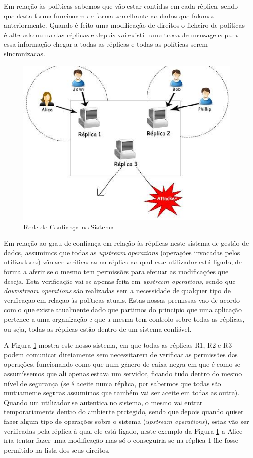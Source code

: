 \documentclass[runningheads,a4paper]{llncs}
\begin{document}
Em relação às políticas sabemos que vão estar contidas em cada réplica, sendo que desta forma funcionam de forma semelhante ao dados que falamos anteriormente. Quando é feito uma modificação de direitos o ficheiro de políticas é alterado numa das réplicas e depois vai existir uma troca de mensagens para essa informação chegar a todas as réplicas e todas as políticas serem sincronizadas.

\begin{figure}[h]
\centering
\includegraphics[scale=0.6]{Figure2}
\caption{Rede de Confiança no Sistema}
\label{fig:figure2.1}
\end{figure}

Em relação ao grau de confiança em relação às réplicas neste sistema de gestão de dados, assumimos que todas as \textit{upstream operations} (operações invocadas pelos utilizadores) vão ser verificadas na réplica ao qual esse utilizador está ligado, de forma a aferir se o mesmo tem permissões para efetuar as modificações que deseja. Esta verificação vai se apenas feita em \textit{upstream operations}, sendo que \textit{downstream operations} são realizadas sem a necessidade de qualquer tipo de verificação em relação às políticas atuais. Estas nossas premissas vão de acordo com o que existe atualmente dado que partimos do principio que uma aplicação pertence a uma organização e que a mesma tem controlo sobre todas as réplicas, ou seja, todas as réplicas estão dentro de um sistema confiável.

A Figura \ref{fig:figure2.1} mostra este nosso sistema, em que todas as réplicas R1, R2 e R3 podem comunicar diretamente sem necessitarem de verificar as permissões das operações, funcionando como que num género de caixa negra em que é como se assumíssemos que ali apenas estava um servidor, ficando tudo dentro do mesmo nível de segurança (se é aceite numa réplica, por sabermos que todas são mutuamente seguras assumimos que também vai ser aceite em todas as outra). Quando um utilizador se autentica no sistema, o mesmo vai entrar temporariamente dentro do ambiente protegido, sendo que depois quando quiser fazer algum tipo de operações sobre o sistema (\textit{upstream operations}), estas vão ser verificadas pela réplica à qual ele está ligado, neste exemplo da Figura \ref{fig:figure2.1} a Alice iria tentar fazer uma modificação mas só o conseguiria se na réplica 1 lhe fosse permitido na lista dos seus direitos.
\end{document}
